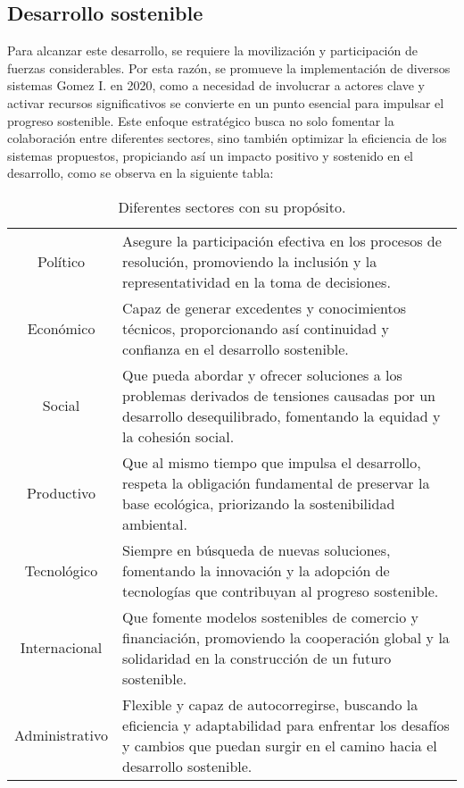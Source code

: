 \documentclass[12pt]{article}
\begin{document}
\subsection{Desarrollo sostenible}
Para alcanzar este desarrollo, se requiere la movilización y participación de fuerzas considerables. Por esta razón, se promueve la implementación de diversos sistemas Gomez I. en 2020, como a necesidad de involucrar a actores clave y activar recursos significativos se convierte en un punto esencial para impulsar el progreso sostenible. Este enfoque estratégico busca no solo fomentar la colaboración entre diferentes sectores, sino también optimizar la eficiencia de los sistemas propuestos, propiciando así un impacto positivo y sostenido en el desarrollo, como se observa en la siguiente tabla: 
\begin{table}[h]
	\centering
	\caption{Diferentes sectores con su propósito.}
\begin{tabular}{|c|p{10cm}|}
	\hline
	&  \\
	\hline
	Político & Asegure la participación efectiva en los procesos de resolución, promoviendo la inclusión y la representatividad en la toma de decisiones.  \\
	\hline
	Económico & Capaz de generar excedentes y conocimientos técnicos, proporcionando así continuidad y confianza en el desarrollo sostenible. \\
	\hline
	Social & Que pueda abordar y ofrecer soluciones a los problemas derivados de tensiones causadas por un desarrollo desequilibrado, fomentando la equidad y la cohesión social.  \\
	\hline
	Productivo & Que al mismo tiempo que impulsa el desarrollo, respeta la obligación fundamental de preservar la base ecológica, priorizando la sostenibilidad ambiental. \\
	\hline
	Tecnológico & Siempre en búsqueda de nuevas soluciones, fomentando la innovación y la adopción de tecnologías que contribuyan al progreso sostenible. \\
	\hline
	Internacional & Que fomente modelos sostenibles de comercio y financiación, promoviendo la cooperación global y la solidaridad en la construcción de un futuro sostenible.  \\
	\hline
	Administrativo & Flexible y capaz de autocorregirse, buscando la eficiencia y adaptabilidad para enfrentar los desafíos y cambios que puedan surgir en el camino hacia el desarrollo sostenible.  \\
	\hline
\end{tabular}	
\end{table} 
\newpage
\end{document}
